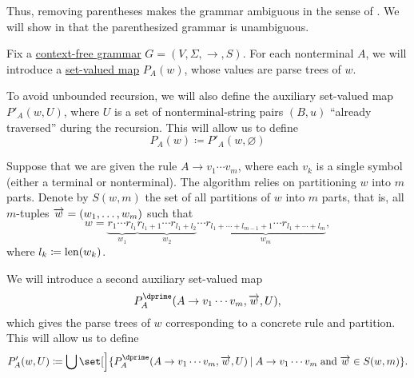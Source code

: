 \begin{example}
\begin{thmenum}
    Thus, removing parentheses makes the grammar ambiguous in the sense of . We will show in  that the parenthesized grammar is unambiguous.
  \end{thmenum}
\end{example}

\begin{algorithm}\label{alg:brute_force_parsing}
  Fix a \hyperref[def:chomsky_hierarchy/context_free]{context-free grammar} \( G = (V, \Sigma, \to, S) \). For each nonterminal \( A \), we will introduce a \hyperref[def:function]{set-valued map} \( P_A(w) \), whose values are parse trees of \( w \).

  To avoid unbounded recursion, we will also define the auxiliary set-valued map \( P'_A(w, U) \), where \( U \) is a set of nonterminal-string pairs \( (B, u) \) \enquote{already traversed} during the recursion. This will allow us to define
  \begin{equation*}
    P_A(w)
    \coloneqq
    P'_A(w, \varnothing)
  \end{equation*}

  Suppose that we are given the rule \( A \to v_1 \cdots v_m \), where each \( v_k \) is a single symbol (either a terminal or nonterminal). The algorithm relies on partitioning \( w \) into \( m \) parts. Denote by \( S(w, m) \) the set of all partitions of \( w \) into \( m \) parts, that is, all \( m \)-tuples \( \overrightarrow{w} = (w_1, \ldots, w_m) \) such that
  \begin{equation*}
    w = \underbrace{ r_1 \cdots r_{l_1} }_{w_1} \underbrace{ r_{l_1 + 1} \cdots r_{l_1 + l_2} }_{w_2} \cdots \underbrace{ r_{l_1 + \cdots + l_{m-1} + 1} \cdots r_{l_1 + \cdots + l_m} }_{w_m},
  \end{equation*}
  where \( l_k \coloneqq \operatorname{len}(w_k) \).

  We will introduce a second auxiliary set-valued map
  \begin{equation*}
    P^\dprime_A(A \to v_1 \cdots v_m, \vect w, U),
  \end{equation*}
  which gives the parse trees of \( w \) corresponding to a concrete rule and partition. This will allow us to define
  \begin{equation*}
    P'_A(w, U)
    \coloneqq
    \bigcup\set[\Big]{ P^\dprime_A(A \to v_1 \cdots v_m, \vect w, U) \given A \to v_1 \cdots v_m \T{and} \vect w \in S(w, m) }.
  \end{equation*}


\end{algorithm}

